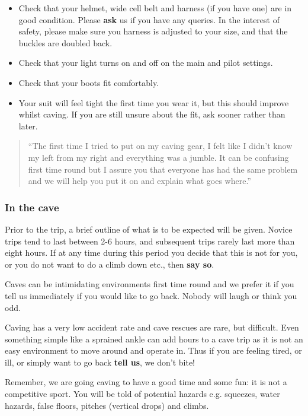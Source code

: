 \documentclass[a4paper,11pt]{article}
\begin{document}
\begin{itemize}
\item Check that your helmet, wide cell belt and harness (if you have one) are in
good condition.  Please {\bf ask} us if you have any queries.  In
the interest of safety, please make sure you harness is adjusted to your size,
and that the buckles are doubled back.

\item Check that your light turns on and off on the main and pilot settings.

\item Check that your boots fit comfortably.

\item Your suit will feel
tight the first time you wear it, but this should improve whilst caving.  If
you are still unsure about the fit, ask sooner rather than later.
\end{itemize}

\begin{quote}
``The first time I tried to put on my caving gear, I felt like I didn't know my
left from my right and everything was a jumble.  It can be confusing first time
round but I assure you that everyone has had the same problem and we will help
you put it on and explain what goes where.''
\end{quote}

\subsubsection*{In the cave}

Prior to the trip, a brief outline of what is to be expected will be given.
Novice trips tend to last between 2-6 hours, and subsequent trips rarely last
more than eight hours.  If at any time during this period you decide that this
is not for you, or you do not want to do a climb down etc., then {\bf say so}.

Caves can be intimidating environments first time round and we prefer it if you
tell us immediately if you would like to go back.  Nobody will laugh or think
you odd.

Caving has a very low accident rate and cave rescues are rare, but difficult.
Even something simple like a sprained ankle can add hours to a cave trip as it
is not an easy environment to move around and operate in.  Thus if you are
feeling tired, or ill, or simply want to go back {\bf tell us}, we don't bite!

Remember, we are going caving to have a good time and some fun: it is not a
competitive sport.  You will be told of potential hazards e.g. squeezes, water
hazards, false floors, pitches (vertical drops) and climbs.
\end{document}

